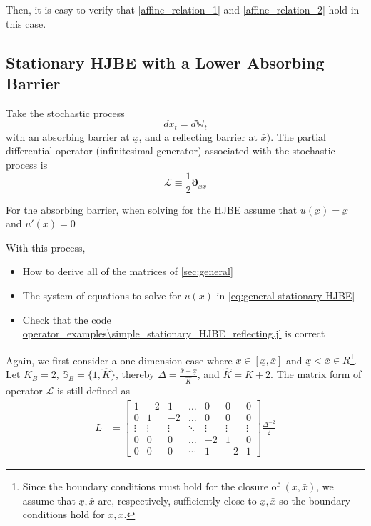 \documentclass[11pt]{article}
\newcommand{\D}[1][]{\ensuremath{\boldsymbol{\partial}_{#1}}}
\newcommand{\W}{\ensuremath{\mathbb{W}}}
\begin{document}
Then, it is easy to verify that \eqref{affine_relation_1} and \eqref{affine_relation_2} hold in this case.

\subsection{Stationary HJBE with a Lower Absorbing Barrier}
Take the stochastic process
$$
d x_t = d \W_t
$$
with an absorbing barrier at $\underline{x}$, and a reflecting barrier at $\bar{x})$.  The partial differential operator (infinitesimal generator) associated with the stochastic process is
$$
\mathcal{L} \equiv \frac{1}{2}\D[xx]
$$

For the absorbing barrier, when solving for the HJBE assume that $u(\underbar{x}) = \underbar{x}$ and $u'(\bar{x}) = 0$


With this process,
\begin{itemize}
	\item How to derive all of the matrices of \cref{sec:general}
	\item The system of equations to solve for $u(x)$ in \cref{eq:general-stationary-HJBE}
	\item Check that the code \url{operator_examples\simple_stationary_HJBE_reflecting.jl} is correct
\end{itemize}

Again, we first consider a one-dimension case where $x\in [\underline{\textit{\~{x}}}, \bar{\textit{\~{x}}}]$ and $\underline{x} < \bar{x} \in R$\footnote{Since the boundary conditions must hold for the closure of $(\underline{x},\bar{x})$, we assume that $\underline{\textit{\~{x}}}, \bar{\textit{\~{x}}}$ are, respectively, sufficiently close to $\underline{x}, \bar{x}$ so the boundary conditions hold for $\underline{\textit{\~{x}}}, \bar{\textit{\~{x}}}$.}. Let $K_B = 2$, $\mathbb{S}_B = \{1,\hat{K}\}$, thereby $\Delta  = \frac{\bar{\textit{\~{x}}}-\underline{\textit{\~{x}}}}{\hat{K}}$, and $\hat{K} = K+2$. The matrix form of operator $\mathcal{L}$ is still defined as
\begin{align}
L &= \begin{bmatrix}
1&-2&1&\dots&0&0&0\\
0&1&-2&\dots&0&0&0\\
\vdots&\vdots&\vdots&\ddots&\vdots&\vdots&\vdots\\
0&0&0&\dots&-2&1&0\\
0&0&0&\cdots&1&-2&1
\end{bmatrix}\frac{\Delta^{-2}}{2}\nonumber
\end{align}
\end{document}
